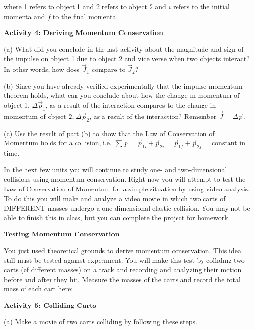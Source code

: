 where 1 refers to object 1 and 2 refers to object 2 and $i$ refers to the initial
momenta and $f$ to the final momenta.

\pagebreak[2]

\textbf{Activity 4: Deriving Momentum Conservation }

(a) What did you conclude in the last activity about the magnitude and sign
of the impulse on object 1 due to object 2 and vice verse when two objects interact?
In other words, how does \( {{\vec  J}_{1}} \) compare to \( {{\vec  J}_{2}} \)? 
\vspace{10mm}

(b) Since you have already verified experimentally that the impulse-momentum
theorem holds, what can you conclude about how the change in momentum of object
1, \( \Delta {{\vec  p}_{1}} \), as a result of the interaction compares
to the change in momentum of object 2, \( \Delta {{\vec  p}_{2}} \),
as a result of the interaction? Remember \( {\vec  J}=\Delta {\vec  p} \).
\vspace{25mm}

(c) Use the result of part (b) to show that the Law of Conservation
of Momentum holds for a collision, i.e. \( \sum {\vec  p} 
=  {{\vec  p}_{1i}}  + {{\vec  p}_{2i}}  = {{\vec  p}_{1f}} 
+ {{\vec  p}_{2f}} \) = constant in time.
\vspace{20mm}

In the next few units you will continue to study one- and two-dimensional collisions
using momentum conservation. Right now you will attempt to test the Law of Conservation
of Momentum for a simple situation by using video analysis. To do this you will
make and analyze a video movie in which two carts of DIFFERENT masses undergo
a one-dimensional elastic collision. You may not be able to finish this in class,
but you can complete the project for homework.

\pagebreak[2]
\textbf{Testing Momentum Conservation }

You just used theoretical grounds to derive momentum conservation. This idea
still must be tested against experiment. You will make this test by colliding
two carts (of different masses) on a track and recording and analyzing their motion 
before and after they hit. Measure the masses of the carts and record the total mass 
of each cart here:

\vspace{10mm}

\textbf{Activity 5: Colliding Carts }

(a) Make a movie of two carts colliding by following these steps. 

